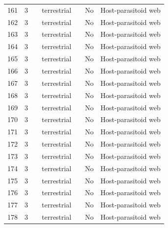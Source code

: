 \documentclass[12pt]{article}
\begin{document}
\begin{landscape}
\begin{table}[h!]
{\begin{tabular}{p{2.8cm}p{1.3cm}p{5.5cm}p{2.2cm}p{2.5cm}lp{3.5cm}}
        161   & 3 & \citet{Askew1961}     & terrestrial &       & No    & Host-parasitoid web \\
        162   & 3 & \citet{Askew1961}     & terrestrial &       & No    & Host-parasitoid web \\
        163   & 3 & \citet{Askew1961}     & terrestrial &       & No    & Host-parasitoid web \\
        164   & 3 & \citet{Askew1961}     & terrestrial &       & No    & Host-parasitoid web \\
        165   & 3 & \citet{Askew1961}     & terrestrial &       & No    & Host-parasitoid web \\
        166   & 3 & \citet{Askew1961}     & terrestrial &       & No    & Host-parasitoid web \\
        167   & 3 & \citet{Askew1961}     & terrestrial &       & No    & Host-parasitoid web \\
        168   & 3 & \citet{Hawkins1984}    & terrestrial &       & No    & Host-parasitoid web \\
        169   & 3 & \citet{Hawkins1984}    & terrestrial &       & No    & Host-parasitoid web \\        
        170   & 3 & \citet{Hawkins1984}    & terrestrial &       & No    & Host-parasitoid web \\
        171   & 3 & \citet{Hawkins1984}    & terrestrial &       & No    & Host-parasitoid web \\      
        172   & 3 & \citet{Hawkins1984}    & terrestrial &       & No    & Host-parasitoid web \\
        173   & 3 & \citet{Hawkins1984}    & terrestrial &       & No    & Host-parasitoid web \\
        174   & 3 & \citet{Hawkins1984}    & terrestrial &       & No    & Host-parasitoid web \\
        175   & 3 & \citet{Hawkins1984}    & terrestrial &       & No    & Host-parasitoid web \\
        176   & 3 & \citet{Hawkins1984}    & terrestrial &       & No    & Host-parasitoid web \\
        177   & 3 & \citet{Hawkins1984}    & terrestrial &       & No    & Host-parasitoid web \\
        178   & 3 & \citet{Hawkins1984}    & terrestrial &       & No    & Host-parasitoid web \\
        \hline
        \end{tabular}}%
      \end{table}


\end{landscape}
\end{document}
